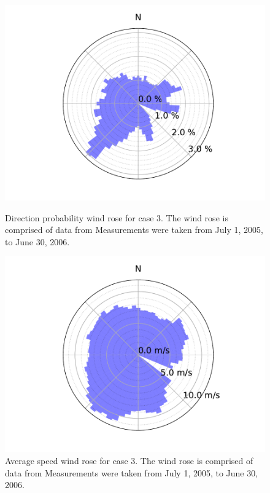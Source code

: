 \documentclass[a4paper]{jpconf}
\begin{document}
\begin{figure}[h!]
	\centering
	\begin{minipage}[t]{18pc}
		\centering
		\includegraphics[width=\textwidth, trim={1.5cm 0cm 1.5cm 0cm}, clip]{final_images/windroses/freqwindrose_72_dir.pdf}
		\caption{Direction probability wind rose for case 3. The wind rose is comprised of data from \cite{noordzeewind2006} Measurements were taken from July 1, 2005, to June 30, 2006.}
		\label{fig:freqwindrose_72dir}
	\end{minipage} \hspace{1pc}%
	\begin{minipage}[t]{18pc}
		\centering
		\includegraphics[width=1.\textwidth, trim={1.5cm, 0cm, 1.5cm, 0cm}, clip]{final_images/windroses/speedwindrose_72_dir.pdf}
		\caption{Average speed wind rose for case 3. The wind rose is comprised of data from \cite{noordzeewind2006} Measurements were taken from July 1, 2005, to June 30, 2006.}
		\label{fig:speedwindrose_72dir}
	\end{minipage}
\end{figure}
\end{document}
